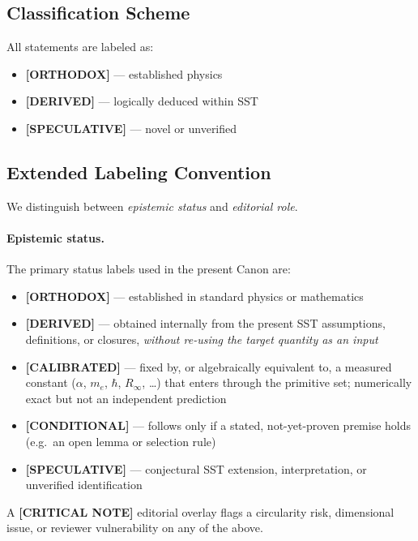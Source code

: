 \documentclass[11pt]{article}
\theoremstyle{definition}
\theoremstyle{plain}
\theoremstyle{remark}
\begin{document}
    \subsection{Classification Scheme}
        
        All statements are labeled as:
        
        \begin{itemize}
            \item \textbf{[ORTHODOX]} — established physics
            \item \textbf{[DERIVED]} — logically deduced within SST
            \item \textbf{[SPECULATIVE]} — novel or unverified
        \end{itemize}

    \subsection{Extended Labeling Convention}

        We distinguish between \emph{epistemic status} and \emph{editorial role}.

        \paragraph{Epistemic status.}
        The primary status labels used in the present Canon are:
        \begin{itemize}
            \item \textbf{[ORTHODOX]} --- established in standard physics or mathematics
            \item \textbf{[DERIVED]} --- obtained internally from the present SST assumptions, definitions, or closures, \emph{without re-using the target quantity as an input}
            \item \textbf{[CALIBRATED]} --- fixed by, or algebraically equivalent to, a measured constant ($\alpha$, $m_e$, $\hbar$, $R_\infty$, \dots) that enters through the primitive set; numerically exact but not an independent prediction
            \item \textbf{[CONDITIONAL]} --- follows only if a stated, not-yet-proven premise holds (e.g.\ an open lemma or selection rule)
            \item \textbf{[SPECULATIVE]} --- conjectural SST extension, interpretation, or unverified identification
        \end{itemize}
        A \textbf{[CRITICAL NOTE]} editorial overlay flags a circularity risk, dimensional issue, or reviewer vulnerability on any of the above.
\end{document}

